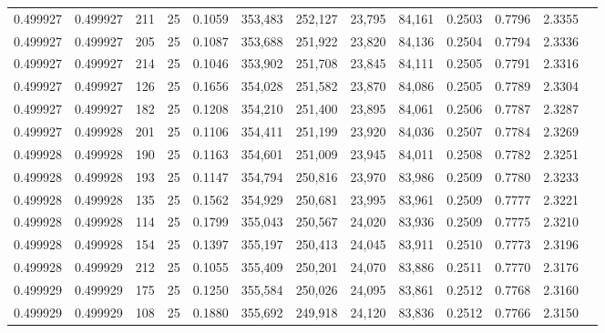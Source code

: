 \begin{tabular}{rrrrrrrrrrrrr}
0.499927 & 0.499927 &   211 &  25 &                                     0.1059 & 353,483 & 252,127 &  23,795 &  84,161 & 0.2503 & 0.7796 & 2.3355 \\
0.499927 & 0.499927 &   205 &  25 &                                     0.1087 & 353,688 & 251,922 &  23,820 &  84,136 & 0.2504 & 0.7794 & 2.3336 \\
0.499927 & 0.499927 &   214 &  25 &                                     0.1046 & 353,902 & 251,708 &  23,845 &  84,111 & 0.2505 & 0.7791 & 2.3316 \\
0.499927 & 0.499927 &   126 &  25 &                                     0.1656 & 354,028 & 251,582 &  23,870 &  84,086 & 0.2505 & 0.7789 & 2.3304 \\
0.499927 & 0.499927 &   182 &  25 &                                     0.1208 & 354,210 & 251,400 &  23,895 &  84,061 & 0.2506 & 0.7787 & 2.3287 \\
0.499927 & 0.499928 &   201 &  25 &                                     0.1106 & 354,411 & 251,199 &  23,920 &  84,036 & 0.2507 & 0.7784 & 2.3269 \\
0.499928 & 0.499928 &   190 &  25 &                                     0.1163 & 354,601 & 251,009 &  23,945 &  84,011 & 0.2508 & 0.7782 & 2.3251 \\
0.499928 & 0.499928 &   193 &  25 &                                     0.1147 & 354,794 & 250,816 &  23,970 &  83,986 & 0.2509 & 0.7780 & 2.3233 \\
0.499928 & 0.499928 &   135 &  25 &                                     0.1562 & 354,929 & 250,681 &  23,995 &  83,961 & 0.2509 & 0.7777 & 2.3221 \\
0.499928 & 0.499928 &   114 &  25 &                                     0.1799 & 355,043 & 250,567 &  24,020 &  83,936 & 0.2509 & 0.7775 & 2.3210 \\
0.499928 & 0.499928 &   154 &  25 &                                     0.1397 & 355,197 & 250,413 &  24,045 &  83,911 & 0.2510 & 0.7773 & 2.3196 \\
0.499928 & 0.499929 &   212 &  25 &                                     0.1055 & 355,409 & 250,201 &  24,070 &  83,886 & 0.2511 & 0.7770 & 2.3176 \\
0.499929 & 0.499929 &   175 &  25 &                                     0.1250 & 355,584 & 250,026 &  24,095 &  83,861 & 0.2512 & 0.7768 & 2.3160 \\
0.499929 & 0.499929 &   108 &  25 &                                     0.1880 & 355,692 & 249,918 &  24,120 &  83,836 & 0.2512 & 0.7766 & 2.3150 \\

\end{tabular}
